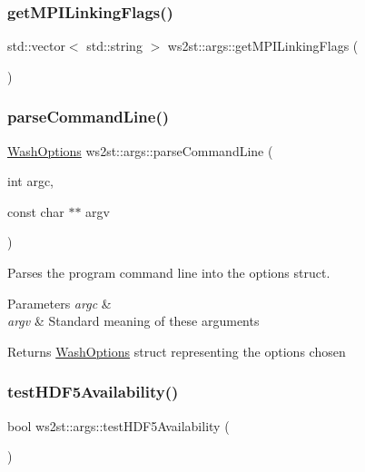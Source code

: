\subsubsection{\texorpdfstring{get\+M\+P\+I\+Linking\+Flags()}{getMPILinkingFlags()}}
{\footnotesize\ttfamily std\+::vector$<$ std\+::string $>$ ws2st\+::args\+::get\+M\+P\+I\+Linking\+Flags (\begin{DoxyParamCaption}{ }\end{DoxyParamCaption})}

\mbox{\label{namespacews2st_1_1args_a31feaff450a079474a31a11a8f45862e}} 
\subsubsection{\texorpdfstring{parse\+Command\+Line()}{parseCommandLine()}}
{\footnotesize\ttfamily \mbox{\hyperlink{structWashOptions}{Wash\+Options}} ws2st\+::args\+::parse\+Command\+Line (\begin{DoxyParamCaption}\item[{int}]{argc,  }\item[{const char $\ast$$\ast$}]{argv }\end{DoxyParamCaption})}



Parses the program command line into the options struct. 


\begin{DoxyParams}{Parameters}
{\em argc} & \\
\hline
{\em argv} & Standard meaning of these arguments \\
\hline
\end{DoxyParams}
\begin{DoxyReturn}{Returns}
\mbox{\hyperlink{structWashOptions}{Wash\+Options}} struct representing the options chosen 
\end{DoxyReturn}
\mbox{\label{namespacews2st_1_1args_a533a5aab05c3bf24aee0255a7d7a4c91}} 
\subsubsection{\texorpdfstring{test\+H\+D\+F5\+Availability()}{testHDF5Availability()}}
{\footnotesize\ttfamily bool ws2st\+::args\+::test\+H\+D\+F5\+Availability (\begin{DoxyParamCaption}{ }\end{DoxyParamCaption})}

